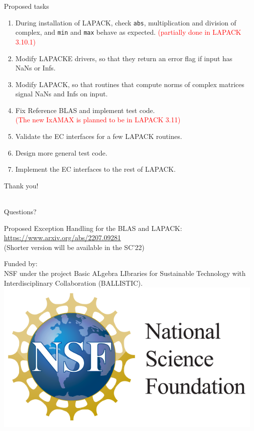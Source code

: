 \documentclass[11pt]{beamer}
\begin{document}
\begin{frame}{Proposed tasks}

	\begin{enumerate}
		\setlength\itemsep{0.7em}
		\item During installation of LAPACK, check \texttt{abs}, multiplication and division of complex, and \texttt{min} and \texttt{max} behave as expected. \textcolor{red}{(partially done in LAPACK 3.10.1)}
		\item Modify LAPACKE drivers, so that they return an error flag if input has NaNs or Infs.
		\item Modify LAPACK, so that routines that compute norms of complex matrices signal NaNs and Infs on input.
		\item Fix Reference BLAS and implement test code.\\
		\textcolor{red}{(The new IxAMAX is planned to be in LAPACK 3.11)}
		\item Validate the EC interfaces for a few LAPACK routines.
		\item Design more general test code.
		\item Implement the EC interfaces to the rest of LAPACK.
	\end{enumerate}

\end{frame}

\begin{frame}

\vspace{50pt}
\begin{center}
	{\LARGE Thank you!}
	
	~\\
	{\Large Questions?}
\end{center}

\vspace{30pt}
\begin{center}
	\small
Proposed Exception Handling
for the BLAS and LAPACK:\\ \url{https://www.arxiv.org/abs/2207.09281}\\
(Shorter version will be available in the SC'22)
\end{center}

\vspace{10pt}
\begin{center}
	\small
Funded by:\\
NSF under the project
Basic ALgebra LIbraries for Sustainable
Technology with Interdisciplinary Collaboration
(BALLISTIC).\\
\includegraphics[height=.15\linewidth]{img/NSF}
\end{center}

\end{frame}
\end{document}
